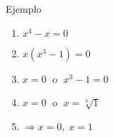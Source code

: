 \documentclass{beamer}
\begin{document}
\begin{frame}{Ejemplo}
	\begin{enumerate}
		\item<1-> $x^4-x=0$ %
		\item<2-> $x(x^3-1)=0$
		\item<3-> $x =0 \;$ o $\;x^3-1=0$
		\item<4-> $x =0 \;$ o $\;x=\sqrt[3]{1}$
		\item<1-> $\Longrightarrow x=0,\; x=1$ %
	\end{enumerate}
\end{frame}
\end{document}
